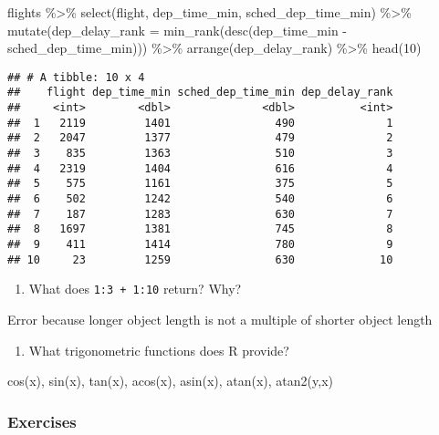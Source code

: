 \documentclass[
]{article}
\newenvironment{Shaded}{\begin{snugshade}}{\end{snugshade}}
\newcommand{\AttributeTok}[1]{\textcolor[rgb]{0.77,0.63,0.00}{#1}}
\newcommand{\DecValTok}[1]{\textcolor[rgb]{0.00,0.00,0.81}{#1}}
\newcommand{\FunctionTok}[1]{\textcolor[rgb]{0.00,0.00,0.00}{#1}}
\newcommand{\NormalTok}[1]{#1}
\newcommand{\SpecialCharTok}[1]{\textcolor[rgb]{0.00,0.00,0.00}{#1}}
\providecommand{\tightlist}{%
  \setlength{\itemsep}{0pt}\setlength{\parskip}{0pt}}
\begin{document}
\begin{Shaded}
\begin{Highlighting}[]
\NormalTok{flights }\SpecialCharTok{\%\textgreater{}\%}
  \FunctionTok{select}\NormalTok{(flight, dep\_time\_min, sched\_dep\_time\_min) }\SpecialCharTok{\%\textgreater{}\%}
  \FunctionTok{mutate}\NormalTok{(}\AttributeTok{dep\_delay\_rank =} \FunctionTok{min\_rank}\NormalTok{(}\FunctionTok{desc}\NormalTok{(dep\_time\_min }\SpecialCharTok{{-}}\NormalTok{ sched\_dep\_time\_min))) }\SpecialCharTok{\%\textgreater{}\%}
  \FunctionTok{arrange}\NormalTok{(dep\_delay\_rank) }\SpecialCharTok{\%\textgreater{}\%}
  \FunctionTok{head}\NormalTok{(}\DecValTok{10}\NormalTok{)}
\end{Highlighting}
\end{Shaded}

\begin{verbatim}
## # A tibble: 10 x 4
##    flight dep_time_min sched_dep_time_min dep_delay_rank
##     <int>        <dbl>              <dbl>          <int>
##  1   2119         1401                490              1
##  2   2047         1377                479              2
##  3    835         1363                510              3
##  4   2319         1404                616              4
##  5    575         1161                375              5
##  6    502         1242                540              6
##  7    187         1283                630              7
##  8   1697         1381                745              8
##  9    411         1414                780              9
## 10     23         1259                630             10
\end{verbatim}

\begin{enumerate}
\def\labelenumi{\arabic{enumi}.}
\tightlist
\item
  What does \texttt{1:3\ +\ 1:10} return? Why?
\end{enumerate}

Error because longer object length is not a multiple of shorter object
length

\begin{enumerate}
\def\labelenumi{\arabic{enumi}.}
\tightlist
\item
  What trigonometric functions does R provide?
\end{enumerate}

cos(x), sin(x), tan(x), acos(x), asin(x), atan(x), atan2(y,x)

\hypertarget{exercises-4}{%
\subsubsection{Exercises}\label{exercises-4}}
\end{document}
